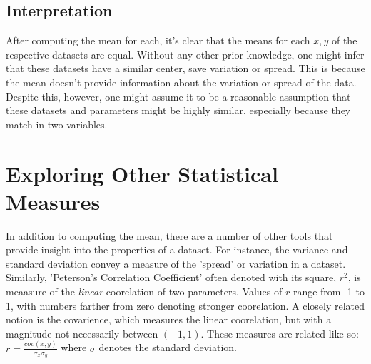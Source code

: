 \documentclass[11pt,a4paper]{article}
\begin{document}
\subsection{Interpretation}

After computing the mean for each, it's clear that the means for each $x, y$ of the respective datasets are equal. Without any other prior knowledge, one might infer that these datasets have a similar center, save variation or spread. This is because the mean doesn't provide information about the variation or spread of the data. Despite this, however, one might assume it to be a reasonable assumption that these datasets and parameters might be highly similar, especially because they match in two variables.

\section{Exploring Other Statistical Measures}

In addition to computing the mean, there are a number of other tools that provide insight into the properties of a dataset. For instance, the variance and standard deviation convey a measure of the 'spread' or variation in a dataset. Similarly, 'Peterson's Correlation Coefficient' often denoted with its square, $r^2$, is meaasure of the \textit{linear} coorelation of two parameters. Values of $r$ range from -1 to 1, with numbers farther from zero denoting stronger coorelation. A closely related notion is the covarience, which measures the linear coorelation, but with a magnitude not necessarily between $(-1, 1)$. These measures are related like so: $r = \frac{cov(x, y)}{\sigma_x \sigma_y}$ where $\sigma$ denotes the standard deviation.
\end{document}
